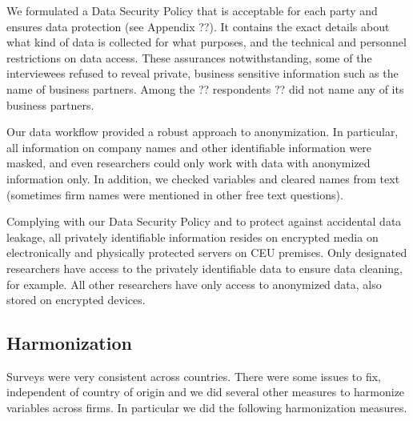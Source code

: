 \documentclass[final, dvipsnames, authoryear,12pt]{elsarticle}
\begin{document}
We formulated a Data Security Policy that is acceptable for each party and ensures data protection (see Appendix ??). It contains the exact details about what kind of data is collected for what purposes, and the technical and personnel restrictions on data access. These assurances notwithstanding, some of the interviewees refused to reveal private, business sensitive information such as the name of business partners. Among the ?? respondents ?? did not name any of its business partners.

Our data workflow provided a robust approach to anonymization. In particular, all information on company names and other identifiable information were masked, and even researchers could only work with data with anonymized  information only. In addition, we checked variables and cleared names from text (sometimes firm names were mentioned in other free text questions).

Complying with our Data Security Policy and to protect against accidental data leakage, all privately identifiable information resides on encrypted media on electronically and physically protected servers on CEU premises. Only designated researchers have access to the privately identifiable data to ensure data cleaning, for example. All other researchers have only access to anonymized data, also stored on encrypted devices.


\subsection{Harmonization} 

Surveys were very consistent across countries. There were some issues to fix, independent of country of origin and we did several other measures to harmonize variables across firms. In particular we did the following harmonization measures.
\end{document}

